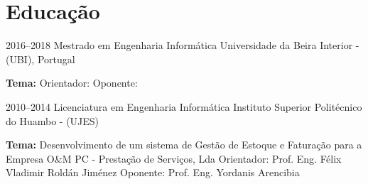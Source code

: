 \section{Educação}

\begin{entrada}

\lista
{2016--2018}
{Mestrado {\normalfont em Engenharia Informática }}
{Universidade da Beira Interior - (UBI), Portugal}
{\vspace{-0.3cm}}

\dissert
{}
{\textbf{Tema:} }
{Orientador: {\normalfont {}}}
{Oponente: {\normalfont {}}}
{\vspace{-0.3cm}}



\lista
{2010--2014}
{Licenciatura {\normalfont em Engenharia Informática }}
{Instituto Superior Politécnico do Huambo - (UJES)}
{\vspace{-0.3cm}}

\dissert
{}
{\textbf{Tema:} Desenvolvimento de um sistema de Gestão de Estoque e Faturação para a Empresa O\&M PC - Prestação de Serviços, Lda}
{Orientador: {\normalfont Prof. Eng. Félix Vladimir Roldán Jiménez}}
{Oponente: {\normalfont Prof. Eng. Yordanis Arencibia}}
{\vspace{-0.3cm}}

\end{entrada}
\vspace{-1.3cm}
\newpage
